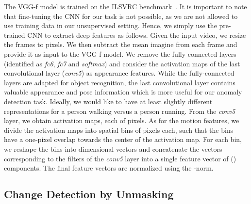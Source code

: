 \documentclass[10pt,twocolumn,letterpaper]{article}
\begin{document}
The VGG-f model is trained on the ILSVRC benchmark~\cite{Russakovsky2015}. It is important to note that fine-tuning the CNN for our task is not possible, as we are not allowed to use training data in our unsupervised setting. Hence, we simply use the pre-trained CNN to extract deep features as follows. Given the input video, we resize the frames to  pixels. We then subtract the mean imagine from each frame and provide it as input to the VGG-f model. We remove the fully-connected layers (identified as \emph{fc6}, \emph{fc7} and \emph{softmax}) and consider the activation maps of the last convolutional layer (\emph{conv5}) as appearance features. While the fully-connected layers are adapted for object recognition, the last convolutional layer contains valuable appearance and pose information which is more useful for our anomaly detection task. Ideally, we would like to have at least slightly different representations for a person walking versus a person running. From the \emph{conv5} layer, we obtain  activation maps, each of  pixels. As for the motion features, we divide the activation maps into  spatial bins of  pixels each, such that the bins have a one-pixel overlap towards the center of the activation map. For each bin, we reshape the bins into  dimensional vectors and concatenate the vectors corresponding to the  filters of the \emph{conv5} layer into a single feature vector of  () components. The final feature vectors are normalized using the -norm.

\subsection{Change Detection by Unmasking}
\label{sec_Unmasking}
\end{document}
